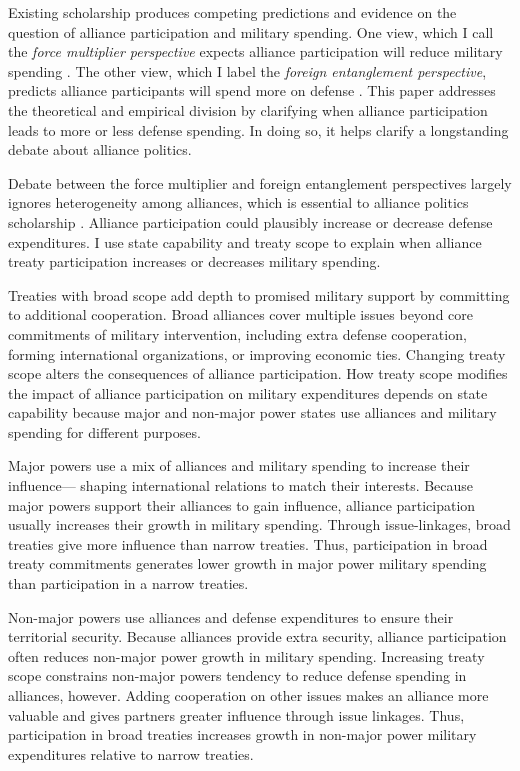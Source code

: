 \documentclass[12pt]{article}
\begin{document}
Existing scholarship produces competing predictions and evidence on the question of alliance participation and military spending. 
One view, which I call the \textit{force multiplier perspective} expects alliance participation will reduce military spending \citep{Morrow1993, Conybeare1994, DigiuseppePoast2016}. 
The other view, which I label the \textit{foreign entanglement perspective}, predicts alliance participants will spend more on defense \citep{Diehl1994, MorganPalmer2006}. 
This paper addresses the theoretical and empirical division by clarifying when alliance participation leads to more or less defense spending. 
In doing so, it helps clarify a longstanding debate about alliance politics.


Debate between the force multiplier and foreign entanglement perspectives largely ignores heterogeneity among alliances, which is essential to alliance politics scholarship \citep{Morrow1991, Leeds2003, LeedsAnac2005, Fordham2010, Mattes2012, Benson2012, Poast2013, Johnsonetal2015}.  
Alliance participation could plausibly increase or decrease defense expenditures. 
I use state capability and treaty scope to explain when alliance treaty participation increases or decreases military spending. 


Treaties with broad scope add depth to promised military support by committing to additional cooperation.
Broad alliances cover multiple issues beyond core commitments of military intervention, including extra defense cooperation, forming international organizations, or improving economic ties.  
Changing treaty scope alters the consequences of alliance participation. 
How treaty scope modifies the impact of alliance participation on military expenditures depends on state capability because major and non-major power states use alliances and military spending for different purposes. 


Major powers use a mix of alliances and military spending to increase their influence--- shaping international relations to match their interests.
Because major powers support their alliances to gain influence, alliance participation usually increases their growth in military spending. 
Through issue-linkages, broad treaties give more influence than narrow treaties.
Thus, participation in broad treaty commitments generates lower growth in major power military spending than participation in a narrow treaties.  


Non-major powers use alliances and defense expenditures to ensure their territorial security.
Because alliances provide extra security, alliance participation often reduces non-major power growth in military spending.   
Increasing treaty scope constrains non-major powers tendency to reduce defense spending in alliances, however. 
Adding cooperation on other issues makes an alliance more valuable and gives partners greater influence through issue linkages. 
Thus, participation in broad treaties increases growth in non-major power military expenditures relative to narrow treaties. 
\end{document}
